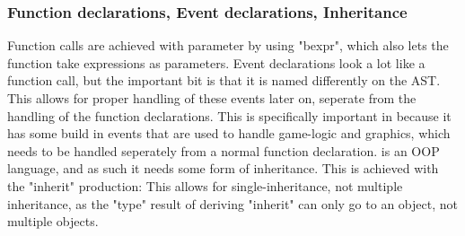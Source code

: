 \subsubsection{Function declarations, Event declarations, Inheritance}
Function calls are achieved with parameter by using "bexpr", which also lets the function take expressions as parameters. Event declarations look a lot like a function call, but the important bit is that it is named differently on the AST. This allows for proper handling of these events later on, seperate from the handling of the function declarations. This is specifically important in \lang{} because it has some build in events that are used to handle game-logic and graphics, which needs to be handled seperately from a normal function declaration.
\lang{} is an OOP language, and as such it needs some form of inheritance. This is achieved with the "inherit" production:
This allows for single-inheritance, not multiple inheritance, as the "type" result of deriving "inherit" can only go to an object, not multiple objects.




